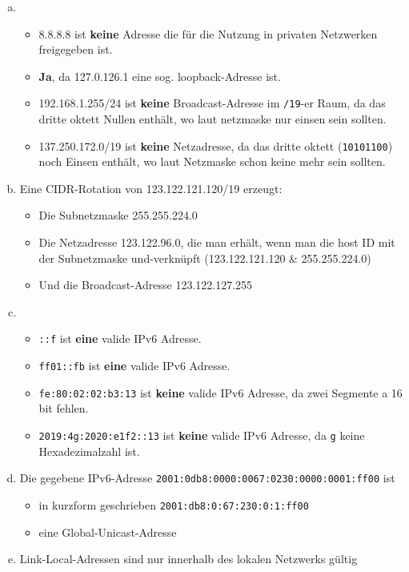 \begin{enumerate}[a)]
	\item \begin{itemize}
		      \item 8.8.8.8 ist \textbf{keine} Adresse die für die Nutzung in privaten Netzwerken freigegeben ist.
		      \item \textbf{Ja}, da 127.0.126.1 eine sog. loopback-Adresse ist.
		      \item 192.168.1.255/24 ist \textbf{keine} Broadcast-Adresse im \texttt{/19}-er Raum, da das dritte oktett Nullen enthält, wo laut netzmaske nur einsen sein sollten.
		      \item 137.250.172.0/19 ist \textbf{keine} Netzadresse, da das dritte oktett (\texttt{10101100}) noch Einsen enthält, wo laut Netzmaske schon keine mehr sein sollten.
	      \end{itemize}
	\item Eine CIDR-Rotation von 123.122.121.120/19 erzeugt:
	      \begin{itemize}
		      \item Die Subnetzmaske 255.255.224.0
		      \item Die Netzadresse 123.122.96.0, die man erhält, wenn man die host ID mit der Subnetzmaske und-verknüpft (123.122.121.120 \& 255.255.224.0)
		      \item Und die Broadcast-Adresse 123.122.127.255
	      \end{itemize}
	\item \begin{itemize}
		      \item \texttt{::f} ist \textbf{eine} valide IPv6 Adresse.
		      \item \texttt{ff01::fb} ist \textbf{eine} valide IPv6 Adresse.
		      \item \texttt{fe:80:02:02:b3:13} ist \textbf{keine} valide IPv6 Adresse, da zwei Segmente a 16 bit fehlen.
		      \item \texttt{2019:4g:2020:e1f2::13} ist \textbf{keine} valide IPv6 Adresse, da \texttt{g} keine Hexadezimalzahl ist.
	      \end{itemize}
	\item Die gegebene IPv6-Adresse \texttt{2001:0db8:0000:0067:0230:0000:0001:ff00} ist
	    \begin{itemize}
			\item in kurzform geschrieben \texttt{2001:db8:0:67:230:0:1:ff00}
			\item eine Global-Unicast-Adresse
	    \end{itemize}
	\item Link-Local-Adressen sind nur innerhalb des lokalen Netzwerks gültig
\end{enumerate}







